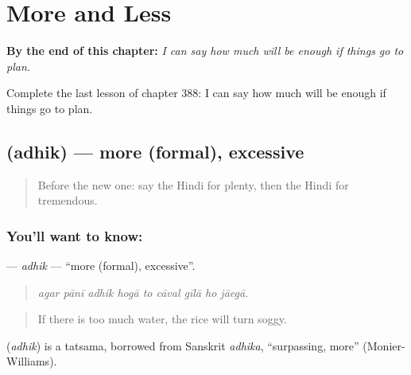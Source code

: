 
\chapter{More and Less}
\label{ch:hi-more-and-less}

\begin{chapteropening}
\textbf{By the end of this chapter:} \emph{I can say how much will be enough if things go to plan.}

Complete the last lesson of chapter 388: I can say how much will be enough if things go to plan.
\end{chapteropening}

\section[\texorpdfstring{\hi{अधिक} (adhik)}{अधिक (adhik)}]{ (adhik) — more (formal), excessive}

\label{lesson:HI-C388-adhik}



\begin{quote}
Before the new one: say the Hindi for plenty, then the Hindi for tremendous.
\end{quote}

\subsection*{You'll want to know: }
\textbf{} — \emph{adhik} — \textquotedblleft{}more (formal), excessive\textquotedblright{}.

\begin{quote}
        
\end{quote}

\begin{quote}
\emph{agar pānī adhik hogā to cāval gīlā ho jāegā.}
\end{quote}

\begin{quote}
If there is too much water, the rice will turn soggy.
\end{quote}

\begin{cousinweb}
\textbf{} (\emph{adhik}) is a tatsama, borrowed from Sanskrit \emph{adhika}, \textquotedblleft{}surpassing, more\textquotedblright{} (Monier-Williams).
\end{cousinweb}

